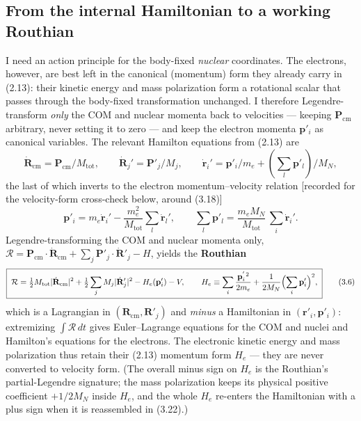 \subsection{From the internal Hamiltonian to a working Routhian}

I need an action principle for the body-fixed \emph{nuclear} coordinates. The electrons, however, are best left in the canonical (momentum) form they already carry in (2.13): their kinetic energy and mass polarization form a rotational scalar that passes through the body-fixed transformation unchanged. I therefore Legendre-transform \emph{only} the COM and nuclear momenta back to velocities --- keeping $\mathbf{P}_{\mathrm{cm}}$ arbitrary, never setting it to zero --- and keep the electron momenta $\mathbf{p}'_i$ as canonical variables. The relevant Hamilton equations from (2.13) are
\begin{equation}
\dot{\mathbf{R}}_{\mathrm{cm}}=\mathbf{P}_{\mathrm{cm}}/M_{\mathrm{tot}},\qquad \dot{\mathbf{R}}_j'=\mathbf{P}'_j/M_j,\qquad \dot{\mathbf{r}}_i'=\mathbf{p}'_i/m_e+(\textstyle\sum_l\mathbf{p}'_l)/M_N, \tag{3.4}
\end{equation}
the last of which inverts to the electron momentum--velocity relation [recorded for the velocity-form cross-check below, around (3.18)]
\begin{equation}
\mathbf{p}'_i=m_e\dot{\mathbf{r}}_i'-\frac{m_e^2}{M_{\mathrm{tot}}}\sum_l\dot{\mathbf{r}}_l',\qquad \sum_l\mathbf{p}'_l=\frac{m_e M_N}{M_{\mathrm{tot}}}\,\sum_i\dot{\mathbf{r}}_i'. \tag{3.5}
\end{equation}
Legendre-transforming the COM and nuclear momenta only, $\mathcal{R}=\mathbf{P}_{\mathrm{cm}}\!\cdot\!\dot{\mathbf{R}}_{\mathrm{cm}}+\sum_j\mathbf{P}'_j\!\cdot\!\dot{\mathbf{R}}'_j-H$, yields the \textbf{Routhian}
\begin{equation}
\boxed{\;\mathcal{R}=\tfrac12 M_{\mathrm{tot}}|\dot{\mathbf{R}}_{\mathrm{cm}}|^2+\tfrac12\sum_j M_j|\dot{\mathbf{R}}_j'|^2-H_e(\mathbf{p}'_i)-V,\qquad H_e\equiv\sum_i\frac{\mathbf{p}_i^{'\,2}}{2m_e}+\frac{1}{2M_N}\Bigl(\sum_i\mathbf{p}'_i\Bigr)^{2},\;} \tag{3.6}
\end{equation}
which is a Lagrangian in $(\mathbf{R}_{\mathrm{cm}},\mathbf{R}'_j)$ and \emph{minus} a Hamiltonian in $(\mathbf{r}'_i,\mathbf{p}'_i)$: extremizing $\int\mathcal{R}\,dt$ gives Euler--Lagrange equations for the COM and nuclei and Hamilton's equations for the electrons. The electronic kinetic energy and mass polarization thus retain their (2.13) momentum form $H_e$ --- they are never converted to velocity form. (The overall minus sign on $H_e$ is the Routhian's partial-Legendre signature; the mass polarization keeps its physical positive coefficient $+1/2M_N$ inside $H_e$, and the whole $H_e$ re-enters the Hamiltonian with a plus sign when it is reassembled in (3.22).)

